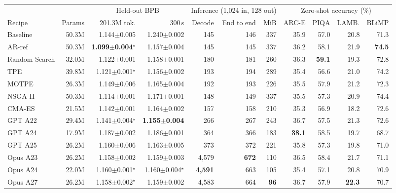 \begin{tabular}{@{}lrrrrrrrrrr@{}}
\toprule
& & \multicolumn{2}{c}{Held-out BPB} & \multicolumn{3}{c}{Inference (1,024 in, 128 out)} & \multicolumn{4}{c}{Zero-shot accuracy (\%)} \\
\cmidrule(lr){3-4}\cmidrule(lr){5-7}\cmidrule(l){8-11}
Recipe & Params & 201.3M tok. & 300\,s & Decode & End to end & MiB & ARC-E & PIQA & LAMB. & BLiMP \\
\midrule
Baseline & 50.3M & 1.144{\tiny$\pm$0.005} & 1.240{\tiny$\pm$0.002} & 145 & 146 & 337 & 35.9 & 57.0 & 20.8 & 71.3 \\
\addlinespace[1.5pt]
AR-ref & 50.3M & \textbf{1.099{\tiny$\pm$0.004}}$^\star$ & 1.157{\tiny$\pm$0.004} & 145 & 145 & 337 & 36.2 & 58.1 & 21.9 & \textbf{74.5} \\
\addlinespace[1.5pt]
Random Search & 32.0M & 1.122{\tiny$\pm$0.001} & 1.158{\tiny$\pm$0.001} & 180 & 181 & 260 & 36.3 & \textbf{59.1} & 19.3 & 72.8 \\
TPE & 39.8M & 1.121{\tiny$\pm$0.001}$^\star$ & 1.156{\tiny$\pm$0.002} & 193 & 194 & 289 & 35.4 & 56.6 & 21.0 & 74.2 \\
MOTPE & 26.3M & 1.149{\tiny$\pm$0.006} & 1.165{\tiny$\pm$0.004} & 192 & 193 & 226 & 35.5 & 57.9 & 21.2 & 72.3 \\
NSGA-II & 50.3M & 1.114{\tiny$\pm$0.001} & 1.171{\tiny$\pm$0.001} & 148 & 149 & 337 & 35.5 & 57.3 & 20.9 & 74.4 \\
CMA-ES & 21.5M & 1.142{\tiny$\pm$0.001} & 1.164{\tiny$\pm$0.002} & 157 & 158 & 210 & 35.3 & 56.9 & 18.2 & 72.6 \\
\addlinespace[1.5pt]
GPT A22 & 29.4M & 1.141{\tiny$\pm$0.004}$^\star$ & \textbf{1.155{\tiny$\pm$0.004}} & 266 & 267 & 243 & 36.7 & 57.5 & 21.3 & 72.6 \\
GPT A24 & 17.9M & 1.187{\tiny$\pm$0.002} & 1.186{\tiny$\pm$0.001} & 364 & 366 & 183 & \textbf{38.1} & 58.5 & 19.7 & 68.7 \\
GPT A25 & 26.2M & 1.160{\tiny$\pm$0.006} & 1.163{\tiny$\pm$0.005} & 373 & 372 & 221 & 35.8 & 57.3 & 19.8 & 71.0 \\
\addlinespace[1.5pt]
Opus A23 & 26.2M & 1.158{\tiny$\pm$0.002} & 1.159{\tiny$\pm$0.003} & 4,579 & \textbf{672} & 110 & 36.5 & 58.4 & 21.7 & 71.1 \\
Opus A24 & 22.0M & 1.160{\tiny$\pm$0.001}$^\star$ & 1.160{\tiny$\pm$0.004}$^\star$ & \textbf{4,591} & 663 & 105 & 35.4 & 57.1 & 20.8 & 70.9 \\
Opus A27 & 26.2M & 1.158{\tiny$\pm$0.002}$^\star$ & 1.159{\tiny$\pm$0.002} & 4,583 & 664 & \textbf{96} & 36.7 & 57.9 & \textbf{22.3} & 70.7 \\
\bottomrule
\end{tabular}
